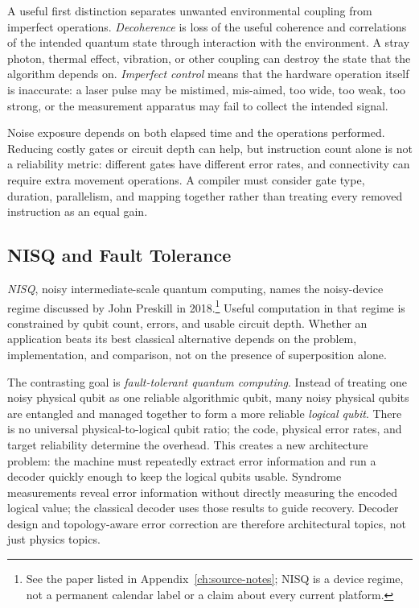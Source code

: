 A useful first distinction separates unwanted environmental coupling from imperfect operations.
\textit{Decoherence} is loss of the useful coherence and correlations of the intended quantum state through interaction with the environment.
A stray photon, thermal effect, vibration, or other coupling can destroy the state that the algorithm depends on.
\textit{Imperfect control} means that the hardware operation itself is inaccurate: a laser pulse may be mistimed, mis-aimed, too wide, too weak, too strong, or the measurement apparatus may fail to collect the intended signal.

Noise exposure depends on both elapsed time and the operations performed.
Reducing costly gates or circuit depth can help, but instruction count alone is not a reliability metric: different gates have different error rates, and connectivity can require extra movement operations.
A compiler must consider gate type, duration, parallelism, and mapping together rather than treating every removed instruction as an equal gain.

\subsection{NISQ and Fault Tolerance}\label{subsec:appd-nisq}
\textit{NISQ}, noisy intermediate-scale quantum computing, names the noisy-device regime discussed by John Preskill in 2018.\footnote{See the paper listed in Appendix~\ref{ch:source-notes}; NISQ is a device regime, not a permanent calendar label or a claim about every current platform.}
Useful computation in that regime is constrained by qubit count, errors, and usable circuit depth.
Whether an application beats its best classical alternative depends on the problem, implementation, and comparison, not on the presence of superposition alone.

The contrasting goal is \textit{fault-tolerant quantum computing}.
Instead of treating one noisy physical qubit as one reliable algorithmic qubit, many noisy physical qubits are entangled and managed together to form a more reliable \textit{logical qubit}.
There is no universal physical-to-logical qubit ratio; the code, physical error rates, and target reliability determine the overhead.
This creates a new architecture problem: the machine must repeatedly extract error information and run a decoder quickly enough to keep the logical qubits usable.
Syndrome measurements reveal error information without directly measuring the encoded logical value; the classical decoder uses those results to guide recovery.
Decoder design and topology-aware error correction are therefore architectural topics, not just physics topics.

